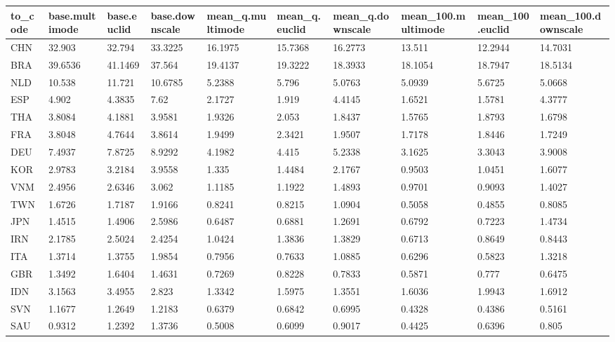 \begin{table}[ht]
\centering
\begin{tabular}{llllllllll}
  \hline
to\_code & base.multimode & base.euclid & base.downscale & mean\_q.multimode & mean\_q.euclid & mean\_q.downscale & mean\_100.multimode & mean\_100.euclid & mean\_100.downscale \\ 
  \hline
CHN & 32.903 & 32.794 & 33.3225 & 16.1975 & 15.7368 & 16.2773 & 13.511 & 12.2944 & 14.7031 \\ 
  BRA & 39.6536 & 41.1469 & 37.564 & 19.4137 & 19.3222 & 18.3933 & 18.1054 & 18.7947 & 18.5134 \\ 
  NLD & 10.538 & 11.721 & 10.6785 & 5.2388 & 5.796 & 5.0763 & 5.0939 & 5.6725 & 5.0668 \\ 
  ESP & 4.902 & 4.3835 & 7.62 & 2.1727 & 1.919 & 4.4145 & 1.6521 & 1.5781 & 4.3777 \\ 
  THA & 3.8084 & 4.1881 & 3.9581 & 1.9326 & 2.053 & 1.8437 & 1.5765 & 1.8793 & 1.6798 \\ 
  FRA & 3.8048 & 4.7644 & 3.8614 & 1.9499 & 2.3421 & 1.9507 & 1.7178 & 1.8446 & 1.7249 \\ 
  DEU & 7.4937 & 7.8725 & 8.9292 & 4.1982 & 4.415 & 5.2338 & 3.1625 & 3.3043 & 3.9008 \\ 
  KOR & 2.9783 & 3.2184 & 3.9558 & 1.335 & 1.4484 & 2.1767 & 0.9503 & 1.0451 & 1.6077 \\ 
  VNM & 2.4956 & 2.6346 & 3.062 & 1.1185 & 1.1922 & 1.4893 & 0.9701 & 0.9093 & 1.4027 \\ 
  TWN & 1.6726 & 1.7187 & 1.9166 & 0.8241 & 0.8215 & 1.0904 & 0.5058 & 0.4855 & 0.8085 \\ 
  JPN & 1.4515 & 1.4906 & 2.5986 & 0.6487 & 0.6881 & 1.2691 & 0.6792 & 0.7223 & 1.4734 \\ 
  IRN & 2.1785 & 2.5024 & 2.4254 & 1.0424 & 1.3836 & 1.3829 & 0.6713 & 0.8649 & 0.8443 \\ 
  ITA & 1.3714 & 1.3755 & 1.9854 & 0.7956 & 0.7633 & 1.0885 & 0.6296 & 0.5823 & 1.3218 \\ 
  GBR & 1.3492 & 1.6404 & 1.4631 & 0.7269 & 0.8228 & 0.7833 & 0.5871 & 0.777 & 0.6475 \\ 
  IDN & 3.1563 & 3.4955 & 2.823 & 1.3342 & 1.5975 & 1.3551 & 1.6036 & 1.9943 & 1.6912 \\ 
  SVN & 1.1677 & 1.2649 & 1.2183 & 0.6379 & 0.6842 & 0.6995 & 0.4328 & 0.4386 & 0.5161 \\ 
  SAU & 0.9312 & 1.2392 & 1.3736 & 0.5008 & 0.6099 & 0.9017 & 0.4425 & 0.6396 & 0.805 \\ 

\end{tabular}
\end{table}
